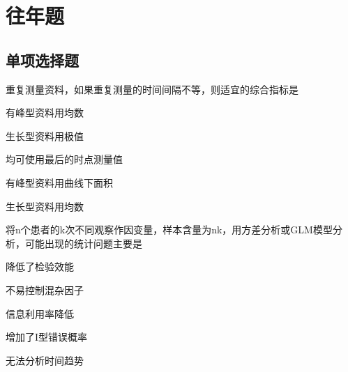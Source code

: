 
\label{chapter:4}

\section{往年题}

\subsection{单项选择题}

\par\addvspace{6pt}\noindent\begin{minipage}{\linewidth}


重复测量资料，如果重复测量的时间间隔不等，则适宜的综合指标是


\begin{choices}

\item 有峰型资料用均数

\item 生长型资料用极值

\item 均可使用最后的时点测量值

\item 有峰型资料用曲线下面积

\item 生长型资料用均数

\end{choices}

\end{minipage}\par\vspace{4pt}

\par\addvspace{6pt}\noindent\begin{minipage}{\linewidth}


将n个患者的k次不同观察作因变量，样本含量为nk，用方差分析或GLM模型分析，可能出现的统计问题主要是


\begin{choices}

\item 降低了检验效能

\item 不易控制混杂因子

\item 信息利用率降低

\item 增加了I型错误概率

\item 无法分析时间趋势

\end{choices}

\end{minipage}\par\vspace{4pt}

